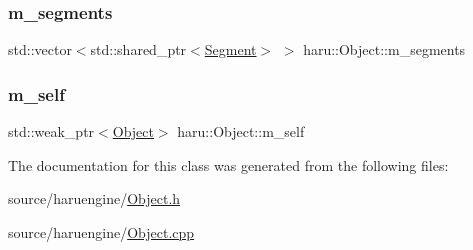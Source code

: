 \subsubsection{\texorpdfstring{m\+\_\+segments}{m\_segments}}
{\footnotesize\ttfamily std\+::vector$<$std\+::shared\+\_\+ptr$<$\mbox{\hyperlink{classharu_1_1_segment}{Segment}}$>$ $>$ haru\+::\+Object\+::m\+\_\+segments\hspace{0.3cm}{\ttfamily [private]}}

\mbox{\label{classharu_1_1_object_ae204b014fc8c7bedc74508da20420769}} 
\subsubsection{\texorpdfstring{m\+\_\+self}{m\_self}}
{\footnotesize\ttfamily std\+::weak\+\_\+ptr$<$\mbox{\hyperlink{classharu_1_1_object}{Object}}$>$ haru\+::\+Object\+::m\+\_\+self\hspace{0.3cm}{\ttfamily [private]}}



The documentation for this class was generated from the following files\+:\begin{DoxyCompactItemize}
\item 
source/haruengine/\mbox{\hyperlink{_object_8h}{Object.\+h}}\item 
source/haruengine/\mbox{\hyperlink{_object_8cpp}{Object.\+cpp}}\end{DoxyCompactItemize}
